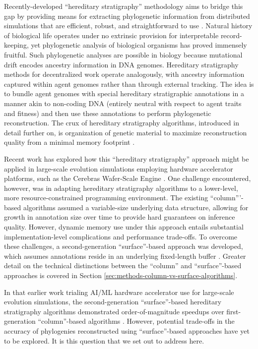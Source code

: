 Recently-developed ``hereditary stratigraphy'' methodology aims to bridge this gap by providing means for extracting phylogenetic information from distributed simulations that are efficient, robust, and straightforward to use \citep{moreno2022hereditary}.
Natural history of biological life operates under no extrinsic provision for interpretable record-keeping, yet phylogenetic analysis of biological organisms has proved immensely fruitful.
Such phylogenetic analyses are possible in biology because mutational drift encodes ancestry information in DNA genomes.
Hereditary stratigraphy methods for decentralized work operate analogously, with ancestry information captured within agent genomes rather than through external tracking.
The idea is to bundle agent genomes with special hereditary stratigraphic annotations in a manner akin to non-coding DNA (entirely neutral with respect to agent traits and fitness) and then use these annotations to perform phylogenetic reconstruction.
The crux of hereditary stratigraphy algorithms, introduced in detail further on, is organization of genetic material to maximize reconstruction quality from a minimal memory footprint \citep{moreno2022hereditary}.

Recent work has explored how this ``hereditary stratigraphy'' approach might be applied in large-scale evolution simulations employing hardware accelerator platforms, such as the Cerebras Wafer-Scale Engine \citep{moreno2024trackable}.
One challenge encountered, however, was in adapting hereditary stratigraphy algorithms to a lower-level, more resource-constrained programming environment.
The existing ``column'''-based algorithms assumed a variable-size underlying data structure, allowing for growth in annotation size over time to provide hard guarantees on inference quality.
However, dynamic memory use under this approach entails substantial implementation-level complications and performance trade-offs.
To overcome these challenges, a second-generation ``surface''-based approach was developed, which assumes annotations reside in an underlying fixed-length buffer \citep{moreno2024algorithms}.
Greater detail on the technical distinctions between the ``column'' and ``surface''-based approaches is covered in Section \ref{sec:methods-column-vs-surface-algorithms}.

In that earlier work trialing AI/ML hardware accelerator use for large-scale evolution simulations, the second-generation ``surface''-based hereditary stratigraphy algorithms demonstrated order-of-magnitude speedups over first-generation ``column''-based algorithms \citep{moreno2024trackable}.
However, potential trade-offs in the accuracy of phylogenies reconstructed using ``surface''-based approaches have yet to be explored.
It is this question that we set out to address here.


